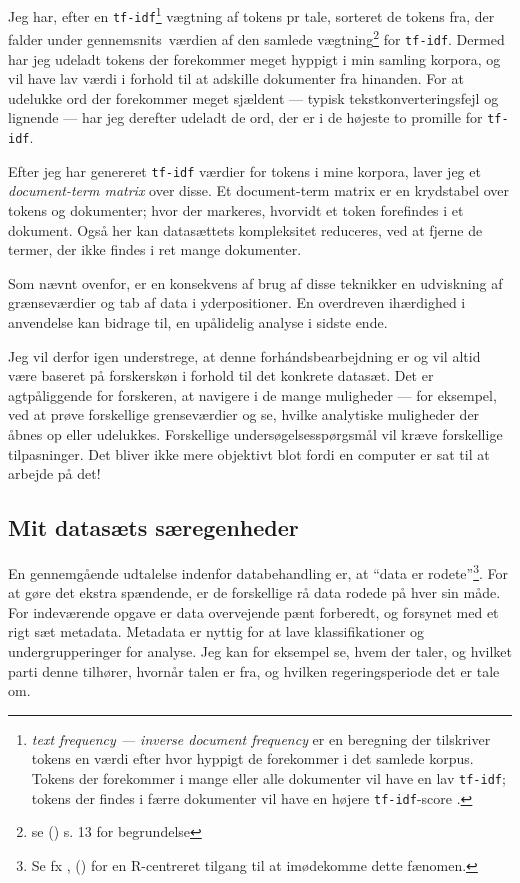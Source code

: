 Jeg har, efter en \texttt{tf-idf}\footnote{\textit{text frequency — inverse document frequency} er en beregning der tilskriver tokens en værdi efter hvor hyppigt de forekommer i det samlede korpus.
  Tokens der forekommer i mange eller alle dokumenter vil have en lav \texttt{tf-idf}; tokens der findes i færre dokumenter vil have en højere \texttt{tf-idf}-score \autocite[s. 29]{silgeTextMiningTidy2017}.} vægtning af tokens pr tale, sorteret de tokens fra, der falder under gennemsnits\ værdien af den samlede vægtning\footnote{se \citeauthor{grunTopicmodelsPackageFitting2011} (\citeyear{grunTopicmodelsPackageFitting2011}) s. 13 for begrundelse} for \texttt{tf-idf}.
Dermed har jeg udeladt tokens der forekommer meget hyppigt i min samling korpora, og vil have lav værdi i forhold til at adskille dokumenter fra hinanden.
For at udelukke ord der forekommer meget sjældent — typisk tekstkonverteringsfejl og lignende — har jeg derefter udeladt de ord, der er i de højeste to promille for \texttt{tf-idf}.

Efter jeg har genereret \texttt{tf-idf} værdier for tokens i mine korpora, laver jeg et \textit{document-term matrix} over disse.
Et document-term matrix er en krydstabel over tokens og dokumenter; hvor der markeres, hvorvidt et token forefindes i et dokument.
Også her kan datasættets kompleksitet reduceres, ved at fjerne de termer, der ikke findes i ret mange dokumenter.

Som nævnt ovenfor, er en konsekvens af brug af disse teknikker en udviskning af grænseværdier og tab af data i yderpositioner.
En overdreven ihærdighed i anvendelse kan bidrage til, en upålidelig analyse i sidste ende.

Jeg vil derfor igen understrege, at denne forhándsbearbejdning er og vil altid være baseret på forskerskøn i forhold til det konkrete datasæt.
Det er agtpåliggende for forskeren, at navigere i de mange muligheder — for eksempel, ved at prøve forskellige grenseværdier og se, hvilke analytiske muligheder der åbnes op eller udelukkes.
Forskellige undersøgelsesspørgsmål vil kræve forskellige tilpasninger.
Det bliver ikke mere objektivt blot fordi en computer er sat til at arbejde på det!

\subsection{Mit datasæts særegenheder}

En gennemgående udtalelse indenfor databehandling er, at “data er rodete”\footnote{Se fx \citeauthor{wickhamTidyData2014}, (\citeyear{wickhamTidyData2014}) for en R-centreret tilgang til at imødekomme dette fænomen.}.
For at gøre det ekstra spændende, er de forskellige rå data rodede på hver sin måde.
For indeværende opgave er data overvejende pænt forberedt, og forsynet med et rigt sæt metadata.
Metadata er nyttig for at lave klassifikationer og undergrupperinger for analyse.
Jeg kan for eksempel se, hvem der taler, og hvilket parti denne tilhører, hvornår talen er fra, og hvilken regeringsperiode det er tale om.

